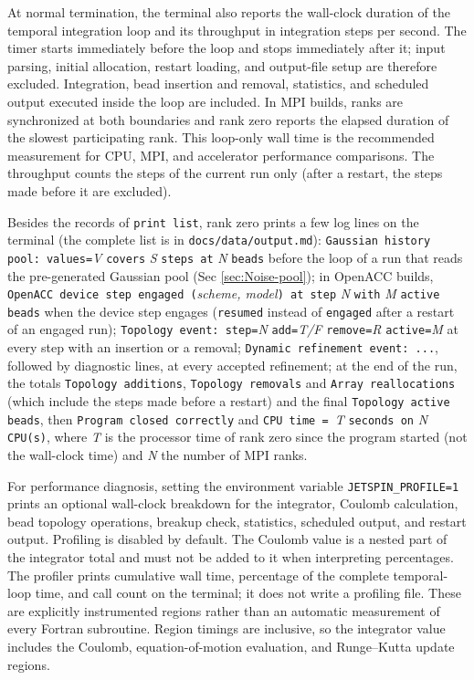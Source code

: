 At normal termination, the terminal also reports the wall-clock duration of
the temporal integration loop and its throughput in integration steps per
second. The timer starts immediately before the loop and stops immediately
after it; input parsing, initial allocation, restart loading, and output-file
setup are therefore excluded. Integration, bead insertion and removal,
statistics, and scheduled output executed inside the loop are included. In
MPI builds, ranks are synchronized at both boundaries and rank zero reports
the elapsed duration of the slowest participating rank. This loop-only wall
time is the recommended measurement for CPU, MPI, and accelerator performance
comparisons. The throughput counts the steps of the current run only (after
a restart, the steps made before it are excluded).

Besides the records of \texttt{print list}, rank zero prints a few log
lines on the terminal (the complete list is in
\texttt{docs/data/output.md}):
\texttt{Gaussian history pool: values=}\textit{V} \texttt{covers}
\textit{S} \texttt{steps at} \textit{N} \texttt{beads} before the loop of a run that reads the pre-generated
Gaussian pool (Sec \ref{sec:Noise-pool}); in OpenACC builds,
\texttt{OpenACC device step engaged (}\textit{scheme, model}\texttt{) at
step} \textit{N} \texttt{with} \textit{M} \texttt{active beads} when the
device step engages (\texttt{resumed} instead of \texttt{engaged} after a
restart of an engaged run); \texttt{Topology event: step=}\textit{N}
\texttt{add=}\textit{T/F} \texttt{remove=}\textit{R}
\texttt{active=}\textit{M} at every step with an insertion or a removal;
\texttt{Dynamic refinement event: ...}, followed by diagnostic lines, at
every accepted refinement; at the end of the run, the totals
\texttt{Topology additions}, \texttt{Topology removals} and
\texttt{Array reallocations} (which include the steps made before a
restart) and the final \texttt{Topology active beads}, then \texttt{Program closed
correctly} and \texttt{CPU time = }\textit{T} \texttt{seconds on}
\textit{N} \texttt{CPU(s)}, where \textit{T} is the processor time of rank
zero since the program started (not the wall-clock time) and \textit{N}
the number of MPI ranks.

For performance diagnosis, setting the environment variable
\texttt{JETSPIN\_PROFILE=1} prints an optional wall-clock breakdown for the
integrator, Coulomb calculation, bead topology operations, breakup check,
statistics, scheduled output, and restart output. Profiling is disabled by default. The
Coulomb value is a nested part of the integrator total and must not be added
to it when interpreting percentages. The profiler prints cumulative wall
time, percentage of the complete temporal-loop time, and call count on the
terminal; it does not write a profiling file. These are explicitly
instrumented regions rather than an automatic measurement of every Fortran
subroutine. Region timings are inclusive, so the integrator value includes
the Coulomb, equation-of-motion evaluation, and Runge--Kutta update regions.

